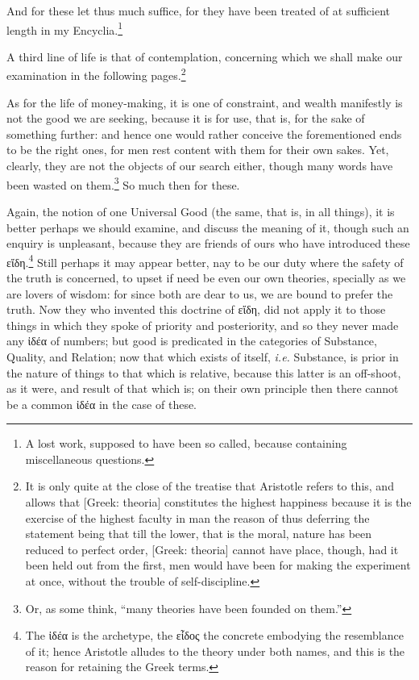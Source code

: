 And for these let thus much suffice, for they have been treated of at
sufficient length in my Encyclia.\footnote{A lost work, supposed to have been so called, because containing miscellaneous
questions.}

A third line of life is that of contemplation, concerning which we shall make
our examination in the following pages.\footnote{It is only quite at the close of the treatise that Aristotle refers to this,
and allows that [Greek: theoria] constitutes the highest happiness because it
is the exercise of the highest faculty in man the reason of thus deferring the
statement being that till the lower, that is the moral, nature has been reduced
to perfect order, [Greek: theoria] cannot have place, though, had it been held
out from the first, men would have been for making the experiment at once,
without the trouble of self-discipline.}

As for the life of money-making, it is one of constraint, and wealth manifestly
is not the good we are seeking, because it is for use, that is, for the sake of
something further: and hence one would rather conceive the forementioned ends
to be the right ones, for men rest content with them for their own sakes. Yet,
clearly, they are not the objects of our search either, though many words have
been wasted on them.\footnote{Or, as some think, “many theories have been founded on them.”}
So much then for these.

Again, the notion of one Universal Good (the same, that is, in all things), it
is better perhaps we should examine, and discuss the meaning of it, though such
an enquiry is unpleasant, because they are friends of ours who have introduced
these εἴδη.\footnote{The ἰδέα is the archetype, the
εἶδος the concrete embodying the resemblance of it;
hence Aristotle alludes to the theory under both names, and this is the reason
for retaining the Greek terms.}
Still perhaps it may appear better, nay to be our duty where the safety of the
truth is concerned, to upset if need be even our own theories, specially as we
are lovers of wisdom: for since both are dear to us, we are bound to prefer the
truth. Now they who invented this doctrine of εἴδη, did
not apply it to those things in which they spoke of priority and posteriority,
and so they never made any ἰδέα of numbers; but good is
predicated in the categories of Substance, Quality, and Relation; now that
which exists of itself, \emph{i.e.} Substance, is prior in the nature of things
to that which is relative, because this latter is an off-shoot, as it were, and
result of that which is; on their own principle then there cannot be a common
ἰδέα in the case of these.

